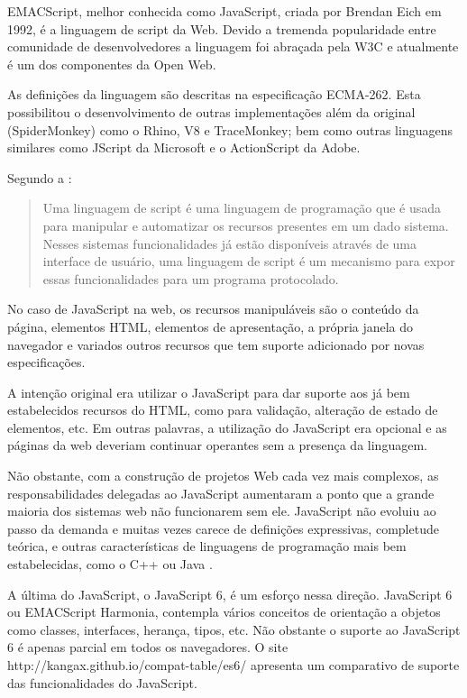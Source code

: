 EMACScript, melhor conhecida como JavaScript, criada por Brendan Eich em
1992, é a linguagem de script da Web. Devido a tremenda popularidade
entre comunidade de desenvolvedores a linguagem foi abraçada pela W3C e
atualmente é um dos componentes da Open Web.

As definições da linguagem são descritas na especificação ECMA-262.
Esta possibilitou o desenvolvimento de outras implementações além da
original (SpiderMonkey) como o Rhino, V8 e TraceMonkey; bem como
outras linguagens similares como JScript da Microsoft e o ActionScript
da Adobe.

Segundo a \cite{ecmaSpecificaton}:
\begin{quote}
Uma linguagem de script é uma linguagem de programação que é
usada para manipular e automatizar os recursos presentes em um dado
sistema. Nesses sistemas funcionalidades já estão disponíveis
através de uma interface de usuário, uma linguagem de script é
um mecanismo para expor essas funcionalidades para um programa
protocolado.
\end{quote}

No caso de JavaScript na web, os recursos manipuláveis são o conteúdo
da página, elementos HTML, elementos de apresentação,
a própria janela do navegador e variados outros recursos que tem
suporte adicionado por novas especificações.

A intenção original era utilizar o JavaScript para dar suporte aos já
bem estabelecidos recursos do HTML, como para validação, alteração
de estado de elementos, etc. Em outras palavras, a utilização do
JavaScript era opcional e as páginas da web deveriam continuar
operantes sem a presença da linguagem.

Não obstante, com a construção de projetos Web cada vez mais complexos, as
responsabilidades delegadas ao JavaScript aumentaram a ponto que a
grande maioria dos sistemas web não funcionarem sem ele.
JavaScript não evoluiu ao passo da demanda e muitas vezes carece de
definições expressivas, completude teórica, e outras características
de linguagens de programação mais bem estabelecidas, como o C++ ou
Java \autocite{crossPlatformMobileGame}.

A última do JavaScript, o JavaScript 6, é um esforço nessa direção.
JavaScript 6 ou EMACScript Harmonia, contempla vários conceitos de
orientação a objetos como classes, interfaces, herança, tipos, etc.
Não obstante o suporte ao JavaScript 6 é apenas parcial em todos
os navegadores. O site http://kangax.github.io/compat-table/es6/
apresenta um comparativo de suporte das funcionalidades do JavaScript.

